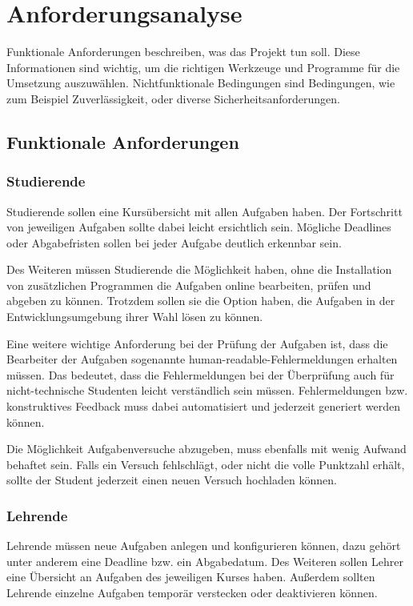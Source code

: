 \section{Anforderungsanalyse}\label{anforderungsanalyse}
Funktionale Anforderungen beschreiben, was das Projekt tun soll. Diese
Informationen sind wichtig, um die richtigen Werkzeuge und Programme für die
Umsetzung auszuwählen. Nichtfunktionale Bedingungen sind Bedingungen, wie zum
Beispiel Zuverlässigkeit, oder diverse Sicherheitsanforderungen.
\subsection{Funktionale Anforderungen}\label{anforderungsanalyse-funktional}
\subsubsection{Studierende}\label{anforderungsanalyse-funktional-stud}
Studierende sollen eine Kursübersicht mit allen Aufgaben haben. Der Fortschritt
von jeweiligen Aufgaben sollte dabei leicht ersichtlich sein. Mögliche Deadlines
oder Abgabefristen sollen bei jeder Aufgabe deutlich erkennbar sein.

Des Weiteren müssen Studierende die Möglichkeit haben, ohne die Installation von zusätzlichen Programmen die Aufgaben online bearbeiten, prüfen und abgeben
zu können. Trotzdem sollen sie die Option haben, die Aufgaben in der Entwicklungsumgebung ihrer Wahl lösen zu können.

Eine weitere wichtige Anforderung bei der Prüfung der Aufgaben ist, dass
die Bearbeiter der Aufgaben sogenannte
\glqq human-readable\grqq{}-Fehlermeldungen erhalten müssen. Das bedeutet, dass
die Fehlermeldungen bei der Überprüfung auch für nicht-technische Studenten
leicht verständlich sein müssen. Fehlermeldungen bzw. konstruktives Feedback
muss dabei automatisiert und jederzeit generiert werden können.

Die Möglichkeit Aufgabenversuche abzugeben, muss ebenfalls mit wenig Aufwand
behaftet sein. Falls ein Versuch fehlschlägt, oder nicht die volle Punktzahl
erhält, sollte der Student jederzeit einen neuen Versuch hochladen können.

\subsubsection{Lehrende}\label{anforderungsanalyse-funktional-lehrende}
Lehrende müssen neue Aufgaben anlegen und konfigurieren können, dazu gehört
unter anderem eine Deadline bzw. ein Abgabedatum. Des Weiteren sollen Lehrer
eine Übersicht an Aufgaben des jeweiligen Kurses haben. Außerdem sollten
Lehrende einzelne Aufgaben temporär verstecken oder deaktivieren können.

